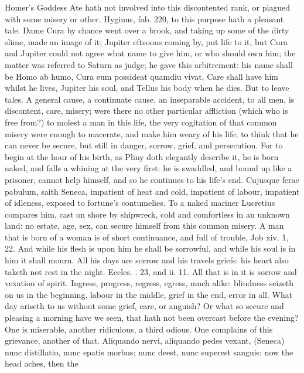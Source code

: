 {Homer's Goddess Ate hath not involved into this discontented
rank, or plagued with some misery or other. Hyginus, fab. 220, to
this purpose hath a pleasant tale. Dame Cura by chance went over a
brook, and taking up some of the dirty slime, made an image of it;
Jupiter eftsoons coming by, put life to it, but Cura and Jupiter could
not agree what name to give him, or who should own him; the matter was
referred to Saturn as judge; he gave this arbitrement: his name shall
be Homo ab humo, Cura eum possideat quamdiu vivat, Care shall have him
whilst he lives, Jupiter his soul, and Tellus his body when he dies.
But to leave tales. A general cause, a continuate cause, an inseparable
accident, to all men, is discontent, care, misery; were there no other
particular affliction (which who is free from?) to molest a man in this
life, the very cogitation of that common misery were enough to
macerate, and make him weary of his life; to think that he can never be
secure, but still in danger, sorrow, grief, and persecution. For to
begin at the hour of his birth, as Pliny doth elegantly describe
it, he is born naked, and falls a whining at the very first: he
is swaddled, and bound up like a prisoner, cannot help himself, and so
he continues to his life's end. Cujusque ferae pabulum, saith
Seneca, impatient of heat and cold, impatient of labour,
impatient of idleness, exposed to fortune's contumelies. To a naked
mariner Lucretius compares him, cast on shore by shipwreck, cold and
comfortless in an unknown land: no estate, age, sex, can secure
himself from this common misery. A man that is born of a woman is of
short continuance, and full of trouble, Job xiv. 1, 22. And while his
flesh is upon him he shall be sorrowful, and while his soul is in him
it shall mourn. All his days are sorrow and his travels griefs: his
heart also taketh not rest in the night. Eccles. . 23, and ii. 11.
All that is in it is sorrow and vexation of spirit. Ingress,
progress, regress, egress, much alike: blindness seizeth on us in the
beginning, labour in the middle, grief in the end, error in all. What
day ariseth to us without some grief, care, or anguish? Or what so
secure and pleasing a morning have we seen, that hath not been overcast
before the evening? One is miserable, another ridiculous, a third
odious. One complains of this grievance, another of that. Aliquando
nervi, aliquando pedes vexant, (Seneca) nunc distillatio, nunc epatis
morbus; nunc deest, nunc superest sanguis: now the head aches, then the
}
